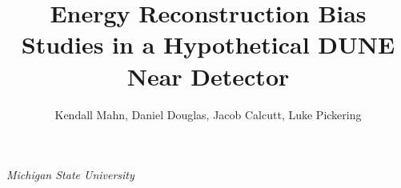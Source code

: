 \documentclass{article}
\title{Energy Reconstruction Bias Studies in a Hypothetical DUNE Near Detector}
\author{Kendall Mahn, Daniel Douglas, Jacob Calcutt, Luke Pickering}
\begin{document}
\maketitle

\begin{center}
  \textit{Michigan State University}
\end{center}

%
%
%
%
%
%
%
\end{document}
